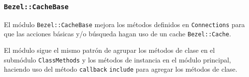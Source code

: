 \subsubsection{\texttt{Bezel::CacheBase}}

El módulo \texttt{Bezel::CacheBase} mejora los métodos definidos en
\texttt{Connections} para que las acciones básicas y/o búsqueda hagan uso de un
cache \texttt{Bezel::Cache}.

El módulo sigue el mismo patrón de agrupar los métodos de clase en el submódulo
\texttt{ClassMethods} y los métodos de instancia en el módulo principal, haciendo
uso del método \texttt{callback} \texttt{include} para agregar los métodos de clase.


